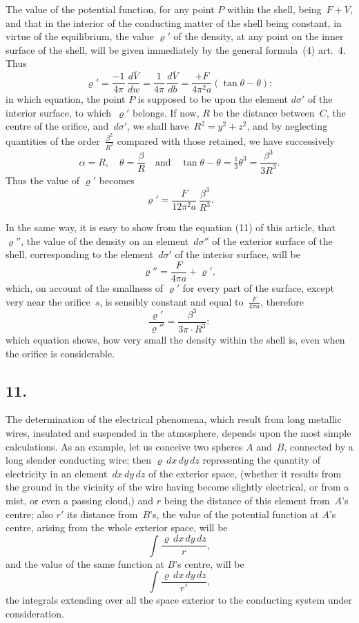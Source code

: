 \documentclass[11pt,notitlepage]{amsart}
\newcommand\Section[1]{\subsection{{#1}}}
\renewcommand{\rho}{\varrho}
\begin{document}
The value of the potential function, for any point $P$ within the shell,
being~${F+V}$, and that in the interior of the conducting matter of the shell
being constant, in virtue of the equilibrium,
the value $\rho'$ of the density, at
any point on the inner surface of the shell, will be given immediately by the
general formula~(4) art.~4. Thus
\[
\rho'=\frac{-1}{4\pi}\,\frac{d\overline{V}}{dw}
=\frac{1}{4\pi}\,\frac{d\overline{V}}{db}
=\frac{+F}{4\pi^2a}(\tan\theta-\theta):
\]
in which equation, the point $P$ is supposed to be upon
the element $d\sigma'$ of the
interior surface, to which~$\rho'$ belongs.
If now, $R$ be the distance between~$C$,
the centre of the orifice, and~$d\sigma'$,
we shall have~$R^2=y^2+z^2$, and by neglecting
quantities of the order~$\frac{\beta^2}{R^2}$
compared with those retained, we have successively
\[
\alpha=R,\quad
\theta=\frac{\beta}{R}\quad\text{and}\quad
\tan\theta-\theta=\tfrac13\theta^3=\frac{\beta^3}{3R^3}.
\]
Thus the value of $\rho'$ becomes
\[
\rho'=\frac{F}{12\pi^2a}\,\frac{\beta^3}{R^3}.
\]

In the same way, it is easy to show from the equation (11) of this
article, that~$\rho''$,
the value of the density on an element~$d\sigma''$ of the exterior
surface of the shell, corresponding
to the element~$d\sigma'$ of the interior surface,
will be
\[
\rho''=\frac{F}{4\pi a}+\rho',
\]
which, on account of the smallness of $\rho'$
for every part of the surface, except
very near the orifice~$s$,
is sensibly constant and equal to~$\frac{F}{4\pi a}$, therefore
\[
\frac{\rho'}{\rho''}=\frac{\beta^3}{3\pi\cdot R^3}:
\]
which equation shows, how very small the density within the shell is, even
when the orifice is considerable.
\bigskip

\Section{11.}
The determination of the electrical phenomena, which result from long
metallic wires, insulated and suspended in the atmosphere, depends upon the
most simple calculations. As an example,
let us conceive two spheres $A$ and~$B$,
connected by a long slender conducting wire;
then $\rho\,dx\,dy\,dz$ representing the
quantity of electricity in an element~$dx\,dy\,dz$ of the exterior space,
(whether
it results from the ground in the vicinity of the wire having become slightly
electrical, or from a mist, or even a passing cloud,) and $r$ being the distance
of this element from~$A$'s centre;
also $r'$ its distance from~$B$'s, the value of
the potential function at $A$'s centre, arising from the whole exterior space,
will be
\[
\int\frac{\rho\,dx\,dy\,dz}{r},
\]
and the value of the same function at $B$'s centre, will be
\[
\int\frac{\rho\,dx\,dy\,dz}{r'},
\]
the integrals extending over all the space exterior to the conducting system
under consideration.
\end{document}
